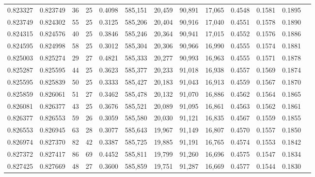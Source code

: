 \begin{tabular}{rrrrrrrrrrrrr}
0.823327 & 0.823749 &    36 &  25 &                                     0.4098 & 585,151 &  20,459 &  90,891 &  17,065 & 0.4548 & 0.1581 & 0.1895 \\
0.823749 & 0.824302 &    55 &  25 &                                     0.3125 & 585,206 &  20,404 &  90,916 &  17,040 & 0.4551 & 0.1578 & 0.1890 \\
0.824315 & 0.824576 &    40 &  25 &                                     0.3846 & 585,246 &  20,364 &  90,941 &  17,015 & 0.4552 & 0.1576 & 0.1886 \\
0.824595 & 0.824998 &    58 &  25 &                                     0.3012 & 585,304 &  20,306 &  90,966 &  16,990 & 0.4555 & 0.1574 & 0.1881 \\
0.825003 & 0.825274 &    29 &  27 &                                     0.4821 & 585,333 &  20,277 &  90,993 &  16,963 & 0.4555 & 0.1571 & 0.1878 \\
0.825287 & 0.825595 &    44 &  25 &                                     0.3623 & 585,377 &  20,233 &  91,018 &  16,938 & 0.4557 & 0.1569 & 0.1874 \\
0.825595 & 0.825839 &    50 &  25 &                                     0.3333 & 585,427 &  20,183 &  91,043 &  16,913 & 0.4559 & 0.1567 & 0.1870 \\
0.825859 & 0.826061 &    51 &  27 &                                     0.3462 & 585,478 &  20,132 &  91,070 &  16,886 & 0.4562 & 0.1564 & 0.1865 \\
0.826081 & 0.826377 &    43 &  25 &                                     0.3676 & 585,521 &  20,089 &  91,095 &  16,861 & 0.4563 & 0.1562 & 0.1861 \\
0.826377 & 0.826553 &    59 &  26 &                                     0.3059 & 585,580 &  20,030 &  91,121 &  16,835 & 0.4567 & 0.1559 & 0.1855 \\
0.826553 & 0.826945 &    63 &  28 &                                     0.3077 & 585,643 &  19,967 &  91,149 &  16,807 & 0.4570 & 0.1557 & 0.1850 \\
0.826974 & 0.827370 &    82 &  42 &                                     0.3387 & 585,725 &  19,885 &  91,191 &  16,765 & 0.4574 & 0.1553 & 0.1842 \\
0.827372 & 0.827417 &    86 &  69 &                                     0.4452 & 585,811 &  19,799 &  91,260 &  16,696 & 0.4575 & 0.1547 & 0.1834 \\
0.827425 & 0.827669 &    48 &  27 &                                     0.3600 & 585,859 &  19,751 &  91,287 &  16,669 & 0.4577 & 0.1544 & 0.1830 \\

\end{tabular}
